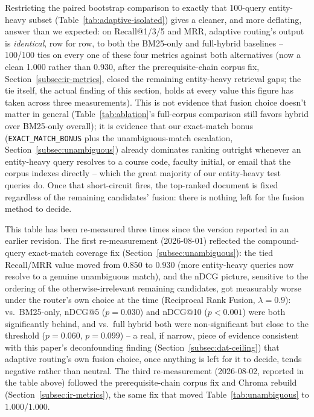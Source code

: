 \documentclass[a4paper,twoside]{article}
\begin{document}
Restricting the paired bootstrap comparison to exactly that 100-query entity-heavy subset (Table~\ref{tab:adaptive-isolated}) gives a cleaner, and more deflating, answer than we expected: on Recall@1/3/5 and MRR, adaptive routing's output is \emph{identical}, row for row, to both the BM25-only and full-hybrid baselines -- 100/100 ties on every one of these four metrics against both alternatives (now a clean 1.000 rather than 0.930, after the prerequisite-chain corpus fix, Section~\ref{subsec:ir-metrics}, closed the remaining entity-heavy retrieval gaps; the tie itself, the actual finding of this section, holds at every value this figure has taken across three measurements). This is not evidence that fusion choice doesn't matter in general (Table~\ref{tab:ablation}'s full-corpus comparison still favors hybrid over BM25-only overall); it is evidence that our exact-match bonus (\texttt{EXACT\_MATCH\_BONUS} plus the unambiguous-match escalation, Section~\ref{subsec:unambiguous}) already dominates ranking outright whenever an entity-heavy query resolves to a course code, faculty initial, or email that the corpus indexes directly -- which the great majority of our entity-heavy test queries do. Once that short-circuit fires, the top-ranked document is fixed regardless of the remaining candidates' fusion: there is nothing left for the fusion method to decide.

This table has been re-measured three times since the version reported in an earlier revision. The first re-measurement (2026-08-01) reflected the compound-query exact-match coverage fix (Section~\ref{subsec:unambiguous}): the tied Recall/MRR value moved from $0.850$ to $0.930$ (more entity-heavy queries now resolve to a genuine unambiguous match), and the nDCG picture, sensitive to the ordering of the otherwise-irrelevant remaining candidates, got measurably worse under the router's own choice at the time (Reciprocal Rank Fusion, $\lambda=0.9$): vs.\ BM25-only, nDCG@5 ($p=0.030$) and nDCG@10 ($p<0.001$) were both significantly behind, and vs.\ full hybrid both were non-significant but close to the threshold ($p=0.060$, $p=0.099$) -- a real, if narrow, piece of evidence consistent with this paper's deconfounding finding (Section~\ref{subsec:dat-ceiling}) that adaptive routing's own fusion choice, once anything is left for it to decide, tends negative rather than neutral. The third re-measurement (2026-08-02, reported in the table above) followed the prerequisite-chain corpus fix and Chroma rebuild (Section~\ref{subsec:ir-metrics}), the same fix that moved Table~\ref{tab:unambiguous} to $1.000$/$1.000$.
\end{document}
